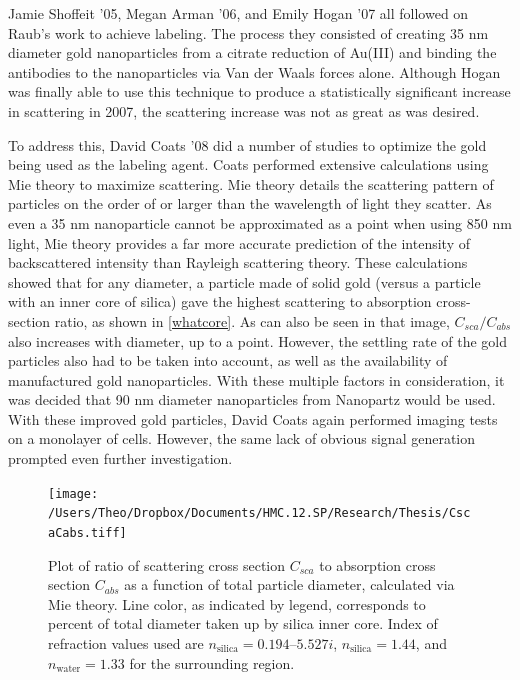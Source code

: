 Jamie Shoffeit '05, Megan Arman '06, and Emily Hogan '07 all followed on Raub's work to achieve labeling. The process they consisted of creating 35 nm diameter gold nanoparticles from a citrate reduction of Au(III) and binding the antibodies to the nanoparticles via Van der Waals forces alone. Although Hogan was finally able to use this technique to produce a statistically significant increase in scattering in 2007, the scattering increase was not as great as was desired.

To address this, David Coats '08 did a number of studies to optimize the gold being used as the labeling agent. Coats performed extensive calculations using Mie theory to maximize scattering. Mie theory details the scattering pattern of particles on the order of or larger than the wavelength of light they scatter. As even a 35 nm nanoparticle cannot be approximated as a point when using 850 nm light, Mie theory provides a far more accurate prediction of the intensity of backscattered intensity than Rayleigh scattering theory. These calculations showed that for any diameter, a particle made of solid gold (versus a particle with an inner core of silica) gave the highest scattering to absorption cross-section ratio, as shown in \autoref{whatcore}. As can also be seen in that image, $C_{sca}/C_{abs}$ also increases with diameter, up to a point. However, the settling rate of the gold particles also had to be taken into account, as well as the availability of manufactured gold nanoparticles. With these multiple factors in consideration, it was decided that 90 nm diameter nanoparticles from Nanopartz would be used. With these improved gold particles, David Coats again performed imaging tests on a monolayer of cells. However, the same lack of obvious signal generation prompted even further investigation.

\begin{figure}[htbp]
\centering
\texttt{[image: /Users/Theo/Dropbox/Documents/HMC.12.SP/Research/Thesis/CscaCabs.tiff]}
\caption{Plot of ratio of scattering cross section $C_{sca}$ to absorption cross section $C_{abs}$ as a function of total particle diameter, calculated via Mie theory. Line color, as indicated by legend, corresponds to percent of total diameter taken up by silica inner core. Index of refraction values used are $n_{\text{silica}}=0.194 – 5.527i$, $n_{\text{silica}}=1.44$, and $n_{\text{water}}=1.33$ for the surrounding region.}
\label{whatcore}
\end{figure}



